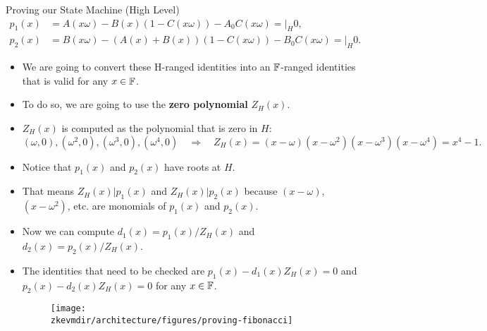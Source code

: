 \begin{frame}[allowframebreaks]{Proving our State Machine (High Level)}
\begin{align*}
p_1(x)&= A(x\omega) - B(x)(1 - C(x\omega)) - A_0C(x\omega) = \bigg\lvert_H 0,\\
p_2(x) &= B(x\omega) - (A(x) + B(x))(1 - C(x\omega)) - B_0 C(x\omega) = \bigg\lvert_H 0.
\end{align*}

\begin{itemize}
\item We are going to convert these H-ranged identities into an $\mathbb{F}$-ranged identities that 
is valid for any $x \in \mathbb{F}$.
\item To do so, we are going to use the \textbf{zero polynomial} $Z_H(x)$.
\item $Z_H(x)$ is computed as the polynomial that is zero in $H$:
\[
(\omega,0), (\omega^2,0), (\omega^3,0), (\omega^4,0) \quad \Longrightarrow \quad Z_H(x) = (x-\omega)(x-\omega^2)(x-\omega^3)(x-\omega^4) = x^4-1.
\]
\item Notice that $p_1(x)$ and $p_2(x)$ have roots at $H$.
\item That means $Z_H(x) | p_1(x)$ and $Z_H(x) | p_2(x)$ 
because $(x-\omega)$, $(x-\omega^2)$, etc. are monomials of $p_1(x)$ and  $p_2(x)$.
\item Now we can compute $d_1(x) = p_1(x) / Z_H(x)$ and $d_2(x) = p_2(x) / Z_H(x)$.
\item The identities that need to be checked are $p_1(x) - d_1(x)Z_H(x) = 0$ and $p_2(x) - d_2(x)Z_H(x) = 0$ 
for any $x \in \mathbb{F}$.
\begin{figure}
\texttt{[image: \\zkevmdir/architecture/figures/proving-fibonacci]}
\end{figure}
\end{itemize}
\end{frame}
